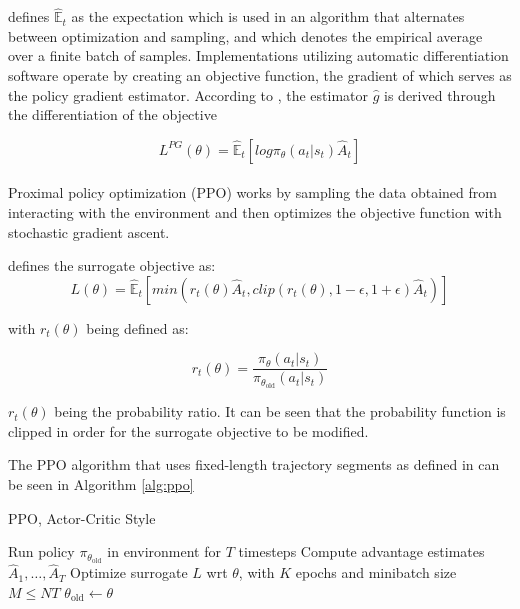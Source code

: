\cite{schulman2017ppo} defines $\hat{\mathbb{E}}_{t}$ as the expectation which is used in an algorithm that alternates between optimization and sampling, and which denotes the empirical average over a finite batch of samples. Implementations utilizing automatic differentiation software operate by creating an objective function, the gradient of which serves as the policy gradient estimator. According to \cite{schulman2017ppo}, the estimator $\hat{g}$ is derived through the differentiation of the objective

\begin{equation}
    L^{PG} (\theta) = \hat{\mathbb{E}}_{t} [log \pi_{\theta}(a_t | s_t) \hat{A}_{t}]
\end{equation}

\paragraph{}
Proximal policy optimization (PPO) works by sampling the data obtained from interacting with the environment and then optimizes the objective function with stochastic gradient ascent.

\cite{shao2019survey} defines the surrogate objective as:
\begin{equation}
    L(\theta) = \hat{\mathbb{E}}_{t} [min(r_t(\theta) \hat{A}_{t}, clip(r_t(\theta), 1-\epsilon, 1+\epsilon) \hat{A}_{t})]
\end{equation}

with $r_t(\theta)$ being defined as:

\begin{equation}
    r_t(\theta) = \frac{\pi_{\theta} (a_t | s_t)}{\pi_{\theta_{\text{old}}} (a_t | s_t)}
\end{equation}

$r_t(\theta)$ being the probability ratio. It can be seen that the probability function is clipped in order for the surrogate objective to be modified.

The PPO algorithm that uses fixed-length trajectory segments as defined in \cite{schulman2017ppo} can be seen in Algorithm \ref{alg:ppo}

\begin{algorithm}
    \caption{PPO, Actor-Critic Style}\label{alg:ppo}
    \begin{algorithmic}
            \State Run policy $\pi_{\theta_{\text{old}}}$ in environment for $T$ timesteps
            \State Compute advantage estimates $\hat{A}_{1}, \dots, \hat{A}_{T}$
        \EndFor
        \State Optimize surrogate $L$ wrt $\theta$, with $K$ epochs and minibatch size $M \leq NT$
        \State $\theta_{\text{old}} \gets \theta$
    \EndFor
    \end{algorithmic}
\end{algorithm}

